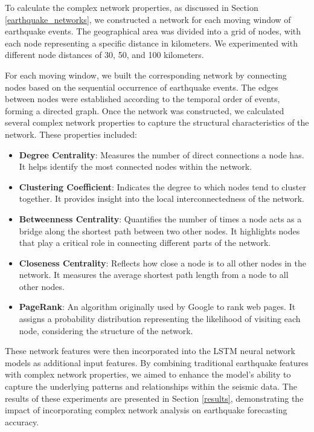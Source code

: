 \documentclass[sn-mathphys-num]{sn-jnl}
\begin{document}
To calculate the complex network properties, as discussed in Section \ref{earthquake_networks}, we constructed a network for each moving window of earthquake events. The geographical area was divided into a grid of nodes, with each node representing a specific distance in kilometers. We experimented with different node distances of 30, 50, and 100 kilometers.

For each moving window, we built the corresponding network by connecting nodes based on the sequential occurrence of earthquake events. The edges between nodes were established according to the temporal order of events, forming a directed graph. Once the network was constructed, we calculated several complex network properties to capture the structural characteristics of the network. These properties included:

\begin{itemize}
    \item \textbf{Degree Centrality}: Measures the number of direct connections a node has. It helps identify the most connected nodes within the network.
    \item \textbf{Clustering Coefficient}: Indicates the degree to which nodes tend to cluster together. It provides insight into the local interconnectedness of the network.
    \item \textbf{Betweenness Centrality}: Quantifies the number of times a node acts as a bridge along the shortest path between two other nodes. It highlights nodes that play a critical role in connecting different parts of the network.
    \item \textbf{Closeness Centrality}: Reflects how close a node is to all other nodes in the network. It measures the average shortest path length from a node to all other nodes.
    \item \textbf{PageRank}: An algorithm originally used by Google to rank web pages. It assigns a probability distribution representing the likelihood of visiting each node, considering the structure of the network.
\end{itemize}

These network features were then incorporated into the LSTM neural network models as additional input features. By combining traditional earthquake features with complex network properties, we aimed to enhance the model's ability to capture the underlying patterns and relationships within the seismic data. The results of these experiments are presented in Section \ref{results}, demonstrating the impact of incorporating complex network analysis on earthquake forecasting accuracy.
\end{document}

